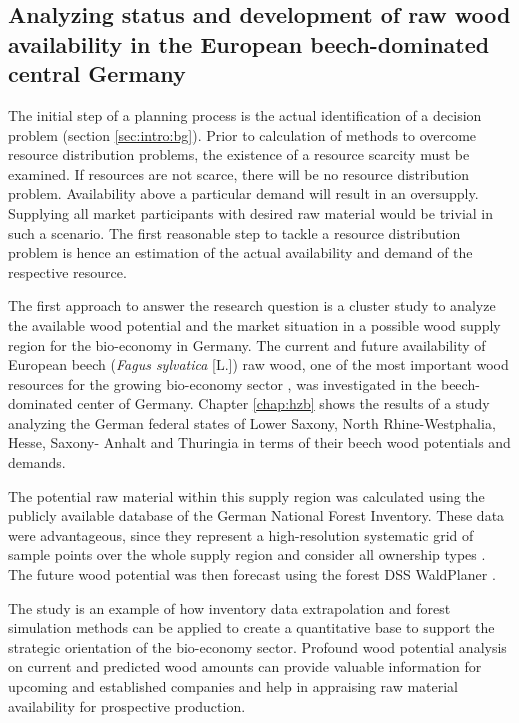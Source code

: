 \subsection{Analyzing status and development of raw wood availability in the European beech-dominated central Germany}
\label{subsec:intro:struct:hzb}
The initial step of a planning process is the actual identification of a decision problem (section \ref{sec:intro:bg}). Prior to calculation of methods to overcome resource distribution problems, the existence of a resource scarcity must be examined. If resources are not scarce, there will be no resource distribution problem. Availability above a particular demand will result in an oversupply. Supplying all market participants with desired raw material would be trivial in such a scenario. The first reasonable step to tackle a resource distribution problem is hence an estimation of the actual availability and demand of the respective resource.

The first approach to answer the research question is a cluster study to analyze the available wood potential and the market situation in a possible wood supply region for the bio-economy in Germany. The current and future availability of European beech (\textit{Fagus sylvatica} [L.]) raw wood, one of the most important wood resources for the growing bio-economy sector \citep[p. 16]{auer_2016}, was investigated in the beech-dominated center of Germany. Chapter \ref{chap:hzb} shows the results of a study analyzing the German federal states of Lower Saxony, North Rhine-Westphalia, Hesse, Saxony- Anhalt and Thuringia in terms of their beech wood potentials and demands.

The potential raw material within this supply region was calculated using the publicly available database of the German National Forest Inventory. These data were advantageous, since they represent a high-resolution systematic grid of sample points over the whole supply region and consider all ownership types \citep{schmitz_2008}. The future wood potential was then forecast using the forest DSS WaldPlaner \citep{hansen_2014}.

The study is an example of how inventory data extrapolation and forest simulation methods can be applied to create a quantitative base to support the strategic orientation of the bio-economy sector. Profound wood potential analysis on current and predicted wood amounts can provide valuable information for upcoming and established companies and help in appraising raw material availability for prospective production.

